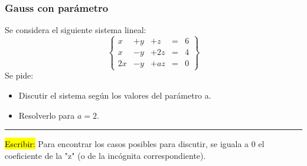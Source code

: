 \documentclass[palatino,nosec]{Docencia}
\begin{document}
\subsubsection{Gauss con parámetro}

Se considera el siguiente sistema lineal:
\[
\left\{\begin{array}{ccccc}
x&+y&+z&=&6\\
x&-y&+2z&=&4\\
2x&-y&+az&=&0
\end{array}\right\}
\]
Se pide:
\begin{itemize}
	\item Discutir el sistema según los valores del parámetro a.
	\item Resolverlo para $a=2$.
\end{itemize}


\hrule

\hl{Escribir:} Para encontrar los casos posibles para discutir, se iguala a 0 el coeficiente de la "z" (o de la incógnita correspondiente).
\end{document}
